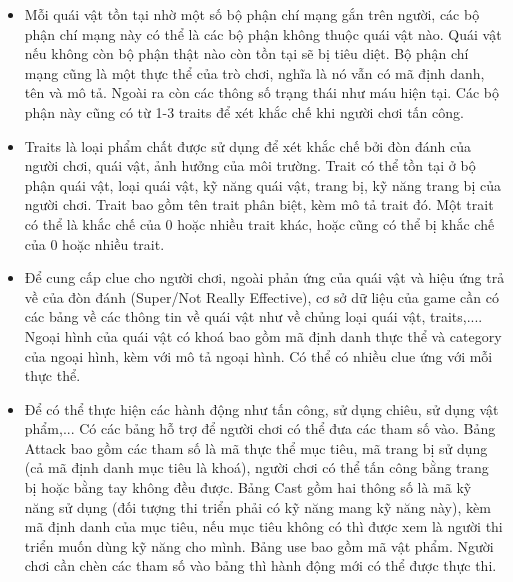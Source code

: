 \begin{itemize}
	\item Mỗi quái vật tồn tại nhờ một số bộ phận chí mạng gắn trên người, các bộ phận chí mạng này có thể là các bộ phận không thuộc quái vật nào. Quái vật nếu không còn bộ phận thật nào còn tồn tại sẽ bị tiêu diệt. Bộ phận chí mạng cũng là một thực thể của trò chơi, nghĩa là nó vẫn có mã định danh, tên và mô tả. Ngoài ra còn các thông số trạng thái như máu hiện tại. Các bộ phận này cũng có từ 1-3 traits để xét khắc chế khi người chơi tấn công.
	
	\item Traits là loại phẩm chất được sử dụng để xét khắc chế bởi đòn đánh của người chơi, quái vật, ảnh hưởng của môi trường. Trait có thể tồn tại ở bộ phận quái vật, loại quái vật, kỹ năng quái vật, trang bị, kỹ năng trang bị của người chơi. Trait bao gồm tên trait phân biệt, kèm mô tả trait đó. Một trait có thể là khắc chế của 0 hoặc nhiều trait khác, hoặc cũng có thể bị khắc chế của 0 hoặc nhiều trait.
	\item Để cung cấp clue cho người chơi, ngoài phản ứng của quái vật và hiệu ứng trả về của đòn đánh (Super/Not Really Effective), cơ sở dữ liệu của game cần có các bảng về các thông tin về quái vật như về chủng loại quái vật, traits,.... Ngoại hình của quái vật có khoá bao gồm mã định danh thực thể và category của ngoại hình, kèm với mô tả ngoại hình. Có thể có nhiều clue ứng với mỗi thực thể.
	
	\item Để có thể thực hiện các hành động như tấn công, sử dụng chiêu, sử dụng vật phẩm,... Có các bảng hỗ trợ để người chơi có thể đưa các tham số vào. Bảng Attack bao gồm các tham số là mã thực thể mục tiêu, mã trang bị sử dụng (cả mã định danh mục tiêu là khoá), người chơi có thể tấn công bằng trang bị hoặc bằng tay không đều được. Bảng Cast gồm hai thông số là mã kỹ năng sử dụng (đối tượng thi triển phải có kỹ năng mang kỹ năng này), kèm mã định danh của mục tiêu, nếu mục tiêu không có thì được xem là người thi triển muốn dùng kỹ năng cho mình. Bảng use bao gồm mã vật phẩm. Người chơi cần chèn các tham số vào bảng thì hành động mới có thể được thực thi.
	
\end{itemize}
